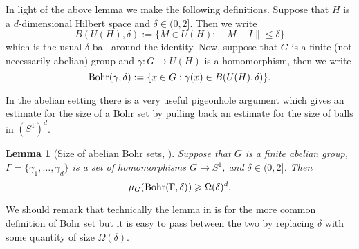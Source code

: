 \documentclass[12pt]{amsart}
\numberwithin{equation}{section}
\theoremstyle{plain}
\newtheorem{lemma}[subsection]{Lemma}
\theoremstyle{definition}
\renewcommand{\leq}{\leqslant}
\renewcommand{\geq}{\geqslant}
\providecommand{\Bohr}{\mathop{\rm Bohr}\nolimits}
\begin{document}
In light of the above lemma we make the following definitions.  Suppose that $H$ is a $d$-dimensional Hilbert space and $\delta \in (0,2]$.  Then we write
\begin{equation*}
B(U(H),\delta):=\{M \in U(H): \|M - I \| \leq \delta\}
\end{equation*}
which is the usual $\delta$-ball around the identity.  Now, suppose that $G$ is a finite (not necessarily abelian) group and $\gamma:G \rightarrow U(H)$ is a homomorphism, then we write
\begin{equation*}
\Bohr(\gamma,\delta):=\{x \in G: \gamma(x) \in B(U(H),\delta)\}.
\end{equation*}

In the abelian setting there is a very useful pigeonhole argument which gives an estimate for the size of a Bohr set by pulling back an estimate for the size of balls in $(S^1)^d$.
\begin{lemma}[Size of abelian Bohr sets, {\cite[Lemma 4.19]{TCTVHV}}]
Suppose that $G$ is a finite abelian group, $\Gamma=\{\gamma_1,\dots,\gamma_d\}$ is a set of homomorphisms $G \rightarrow S^1$, and $\delta \in (0,2]$. Then
\begin{equation*}
\mu_G(\Bohr(\Gamma,\delta)) \geq \Omega(\delta)^d.
\end{equation*}
\end{lemma}
We should remark that technically the lemma in \cite{TCTVHV} is for the more common definition of Bohr set but it is easy to pass between the two by replacing $\delta$ with some quantity of size $\Omega(\delta)$.
\end{document}
